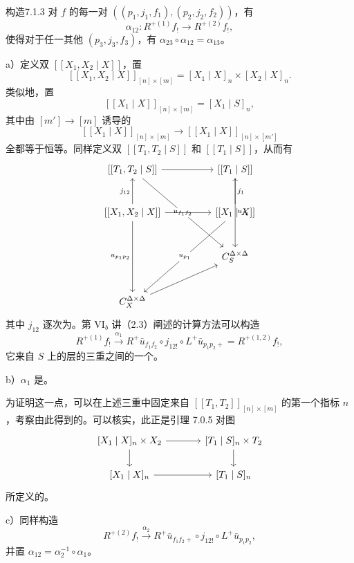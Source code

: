 \begin{SGAresult}{构造}{7.1.3}
对 $f$ 的每一对 $((p_1,j_1,f_1),(p_2,j_2,f_2))$，有
\[\alpha_{12}:R^{+(1)}f_!\longrightarrow R^{+(2)}f_!,\]
使得对于任一其他 $(p_3,j_3,f_3)$，有 $\alpha_{23}\circ\alpha_{12}=\alpha_{13}$。
\end{SGAresult}
a）定义双 $[[X_1,X_2\mid X]]$，置
\[[[X_1,X_2\mid X]]_{[n]\times[m]}=[X_1\mid X]_n\times[X_2\mid X]_n.\]
类似地，置
\[[[X_1\mid X]]_{[n]\times[m]}=[X_1\mid S]_n,\]
其中由 $[m']\to[m]$ 诱导的
\[[[X_1\mid X]]_{[n]\times[m]}\longrightarrow [[X_1\mid X]]_{[n]\times[m']}\]
全都等于恒等。同样定义双 $[[T_1,T_2\mid S]]$ 和 $[[T_1\mid S]]$，从而有
\[
\begin{tikzcd}[column sep=huge,row sep=large]
{[[T_1,T_2\mid S]]}\arrow[r]\arrow[ddr,"u_{f_1f_2}" description]&{[[T_1\mid S]]}\arrow[dd,"u_{f_1}"]\\
{[[X_1,X_2\mid X]]}\arrow[u,"j_{12}"]\arrow[r]\arrow[dd,"u_{p_1p_2}"']&{[[X_1\mid X]]}\arrow[u,"j_1"']\arrow[ddl,"u_{p_1}" description]\\
&C_S^{\Delta\times\Delta}\\
C_X^{\Delta\times\Delta}\arrow[ur]&
\end{tikzcd}
\]
其中 $j_{12}$ 逐次为。第 VI$_b$ 讲（2.3）阐述的计算方法可以构造
\[R^{+(1)}f_!\xrightarrow{\alpha_1}R^+\bar u_{f_1f_2}\circ j_{12!}\circ L^+\bar u_{p_1p_2+}=R^{+(1,2)}f_!,\]
它来自 $S$ 上的层的三重之间的一个。

b）$\alpha_1$ 是。

为证明这一点，可以在上述三重中固定来自 $[[T_1,T_2]]_{[n]\times[m]}$ 的第一个指标 $n$，考察由此得到的。可以核实，此正是引理 7.0.5 对图
\[
\begin{tikzcd}[column sep=large]
{[X_1\mid X]_n\times X_2}\arrow[r]\arrow[d]&{[T_1\mid S]_n\times T_2}\arrow[d]\\
{[X_1\mid X]_n}\arrow[r]&{[T_1\mid S]_n}
\end{tikzcd}
\]
所定义的。

c）同样构造
\[R^{+(2)}f_!\xrightarrow{\alpha_2}R^+\bar u_{f_1f_2+}\circ j_{12!}\circ L^+\bar u_{p_1p_2},\]
并置 $\alpha_{12}=\alpha_2^{-1}\circ\alpha_1$。

